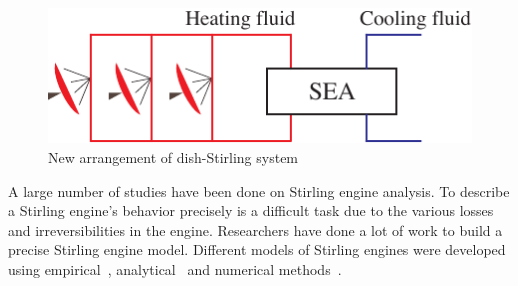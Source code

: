 \documentclass[preprint,5p, twocolumn]{elsarticle}
\begin{document}

\noindent \begin{figure}[htbp]
\begin{center}
	\includegraphics[width = 0.7\columnwidth]{./graphics/Dish_SEA}
	\caption{New arrangement of dish-Stirling system}
	\label{fig:Dish_SEA}
\end{center}
\end{figure}

A large number of studies have been done on Stirling engine analysis. To describe a Stirling engine's behavior precisely is a difficult task due to the various losses and irreversibilities in the engine.
Researchers have done a lot of work to build a precise Stirling engine model. Different models of Stirling engines were developed using empirical~\cite{Senft1998,Costea1999,Prieto2003,Organ2013,Kongtragool2005,Thombare2008}, analytical~\cite{Ohtomo1995,Rogdakis2004,Kongtragool2006,Puech2011,Formosa2010,Shazly2014,Cullen2011,Ahmadi2013,Ahmadi2013b} and numerical methods~\cite{Urieli1984,Strauss2010,Abbas2014,Araoz2015,Babaelahi2015,Barreto2017,Wu1998,Li2011,Hosseinzade2015}.
\end{document}

